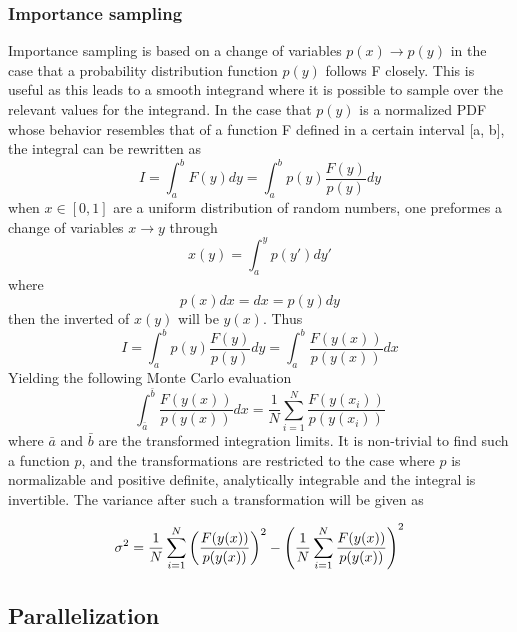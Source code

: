 \documentclass[%
reprint,
amsmath,amssymb,
aps,
]{revtex4-1}
\begin{document}
\subsubsection{Importance sampling}
Importance sampling is based on a change of variables $p(x)\rightarrow p(y)$ in the case that a probability distribution function $p(y)$ follows F closely. This is useful as this leads to a smooth integrand where it is possible to sample over the relevant values for the integrand. In the case that $p(y)$ is a normalized PDF whose behavior resembles that of a function F defined in a certain interval [a, b], the integral can be rewritten as 
\begin{equation}
	I = \int_{a}^{b}F(y)dy = \int_{a}^{b}p(y)\dfrac{F(y)}{p(y)}dy 
\end{equation}
when $x\in[0,1]$ are a uniform distribution of random numbers, one preformes a change of variables $x\rightarrow y$ through
\begin{equation}
	x(y) = \int_{a}^{y}p(y')dy'
\end{equation}
where
\begin{equation}
	p(x)dx = dx = p(y)dy
\end{equation}
then the inverted of $x(y)$ will be $y(x)$. Thus
\begin{equation}
I = \int_{a}^{b}p(y)\dfrac{F(y)}{p(y)}dy  = \int_{a}^{b}\dfrac{F(y(x))}{p(y(x))}dx
\end{equation}
Yielding the following Monte Carlo evaluation 
\begin{equation}
	\int_{\bar{a}}^{\bar{b}}\dfrac{F(y(x))}{p(y(x))}dx = \dfrac{1}{N}\sum_{i=1}^{N}\dfrac{F(y(x_i))}{p(y(x_i))}
\end{equation}
where $\bar{a}$ and $\bar{b}$ are the transformed integration limits. It is non-trivial to find such a function $p$, and the transformations are restricted to the case where $p$ is normalizable and positive definite, analytically integrable and the integral is invertible. The variance after such a transformation will be given as 

\begin{equation}
	\sigma^2 = \dfrac{1}{N}\sum_{i = 1}^{N}\qty(\dfrac{F(y(x))}{p(y(x))})^2 -\qty(\dfrac{1}{N}\sum_{i = 1}^{N}\dfrac{F(y(x))}{p(y(x))})^2
\end{equation}
\subsection{Parallelization}
\newpage 
\end{document}
